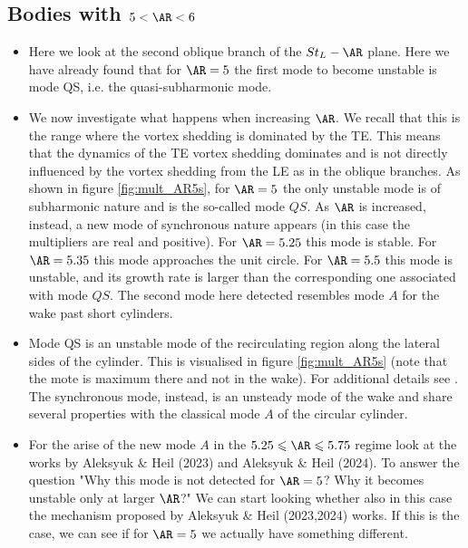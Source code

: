 \documentclass{jfm}
\begin{document}



\subsection{Bodies with $5 < \AR < 6$}

\begin{itemize}
  \item Here we look at the second oblique branch of the $St_L-\AR$ plane. Here we have already found that for $\AR=5$ the first mode to become unstable is mode QS, i.e. the quasi-subharmonic mode.
  \item We now investigate what happens when increasing $\AR$. We recall that this is the range where the vortex shedding is dominated by the TE. This means that the dynamics of the TE vortex shedding dominates and is not directly influenced by the vortex shedding from the LE as in the oblique branches. As shown in figure \ref{fig:mult_AR5s}, for $\AR=5$ the only unstable mode is of subharmonic nature and is the so-called mode $QS$. As $\AR$ is increased, instead, a new mode of synchronous nature appears (in this case the multipliers are real and positive). For $\AR=5.25$ this mode is stable. For $\AR=5.35$ this mode approaches the unit circle. For $\AR=5.5$ this mode is unstable, and its growth rate is larger than the corresponding one associated with mode $QS$. The second mode here detected resembles mode $A$ for the wake past short cylinders. 
  \item Mode QS is an unstable mode of the recirculating region along the lateral sides of the cylinder. This is visualised in figure \ref{fig:mult_AR5s} (note that the mote is maximum there and not in the wake). For additional details see \citep{chiarini-etal-2022}. The synchronous mode, instead, is an unsteady mode of the wake and share several properties with the classical mode $A$ of the circular cylinder.
  \item For the arise of the new mode $A$ in the $5.25 \le \AR \le 5.75$ regime look at the works by Aleksyuk \& Heil (2023) and Aleksyuk \& Heil (2024). To answer the question "Why this mode is not detected for $\AR=5$? Why it becomes unstable only at larger $\AR$?" We can start looking whether also in this case the mechanism proposed by Aleksyuk \& Heil (2023,2024) works. If this is the case, we can see if for $\AR=5$ we actually have something different. 
\end{itemize}
\end{document}
